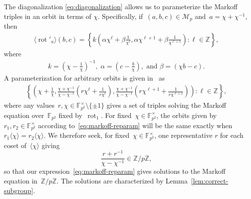 \documentclass{article}
\DeclareMathOperator{\rot}{rot}
\theoremstyle{definition}
\theoremstyle{remark}
\begin{document}
The diagonalization \eqref{eq:diagonalization} allows us to parameterize the Markoff triples in an orbit in terms of $\chi$.
Specifically, if~$(a, b, c) \in \mathcal{M}_p$ and~$a = \chi + \chi^{-1}$, then
\begin{align*}
    \langle \rot'_a\rangle(b, c) = \left\{ k\left(\alpha \chi^\ell + \beta \frac{1}{\chi^\ell}, \alpha \chi^{\ell + 1} + \beta \frac{1}{\chi^{\ell + 1}}\right) : \ell \in \mathbb{Z} \right\},
\end{align*}
where
\begin{align*}
    k = \left(\chi - \frac{1}{\chi}\right)^{-1},\; \alpha = \left(c - \frac{b}{\chi}\right),\text{\ and } \beta = \left(\chi b - c\right).
\end{align*}
A parameterization for arbitrary orbits is given in~\cite[Equation 3]{fuchs} as
\begin{align}
    \left\{ \left( \chi + \frac{1}{\chi}, \frac{\chi + \chi^{-1}}{\chi - \chi^{-1}}\left(r\chi^\ell + \frac{1}{r\chi^\ell}\right), \frac{\chi + \chi^{-1}}{\chi - \chi^{-1}}\left(r\chi^{\ell + 1} + \frac{1}{r\chi^{\ell + 1}}\right)\right) : \ell \in \mathbb{Z} \right\}, \label{eq:markoff-reparam}
\end{align}
where any values~$r, \chi \in \mathbb{F}_{p^2}^\times \setminus \{\pm 1\}$ gives a set of triples solving the Markoff equation over~$\mathbb{F}_{p^2}$ fixed by~$\rot_1$.
For fixed~$\chi \in \mathbb{F}_{p^2}^\times$, the orbits given by $r_1, r_2 \in \mathbb{F}_{p^2}^\times$ according to~\eqref{eq:markoff-reparam} will be the same exactly when~$r_1\langle \chi \rangle = r_2\langle \chi \rangle$.
We therefore seek, for fixed~$\chi \in \mathbb{F}_{p^2}^\times$, one representative $r$ for each coset of~$\langle \chi \rangle$ giving
\[ \frac{r + r^{-1}}{\chi - \chi^{-1}} \in \mathbb{Z} / p\mathbb{Z}, \]
so that our expression~\eqref{eq:markoff-reparam} gives solutions to the Markoff equation in~$\mathbb{Z} / p\mathbb{Z}$.
The solutions are characterized by Lemma~\ref{lem:correct-subgroup}.
\end{document}
